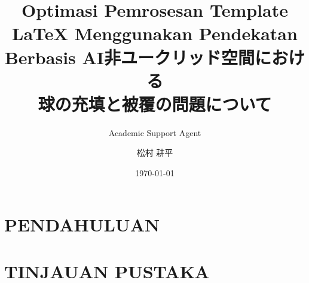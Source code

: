 \documentclass{bxjsreport}
\title{Optimasi Pemrosesan Template LaTeX Menggunakan Pendekatan Berbasis AI}
\author{Academic Support Agent}
\date{\today}
\begin{document}
\maketitle

\begin{abstract}

\end{abstract}

\chapter{PENDAHULUAN}


\chapter{TINJAUAN PUSTAKA}



\usepackage{playful_masterthesis}
\usepackage{natbib}
\usepackage{graphicx}
\usepackage{amsmath}
\usepackage{hyperref}
\hypersetup{
    colorlinks=false
}
\CJKspace



\setcounter{numadvisor}{0} %

\title{非ユークリッド空間における\\球の充填と被覆の問題について} %
\author{松村 耕平} %

\end{document}
